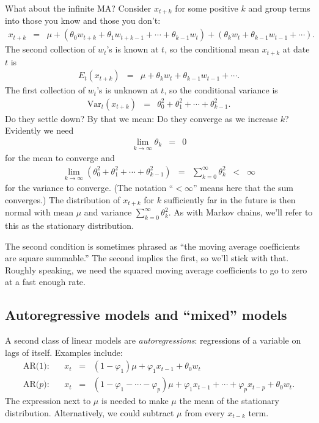 \documentclass[11pt]{article}
\begin{document}
What about the infinite MA?
Consider $x_{t+k}$ for some positive $k$ and group terms into those
you know and those you don't:
\begin{eqnarray*}
    x_{t+k} &=& \mu +
        \left(\theta_0 w_{t+k} + \theta_1 w_{t+k-1} + \cdots + \theta_{k-1} w_t  \right)
            + \left( \theta_k w_{t} + \theta_{k-1} w_{t-1} + \cdots \right) .
\end{eqnarray*}
The second collection of $w_t$'s is known at $t$,
so the conditional mean  $x_{t+k}$ at date $t$ is
\begin{eqnarray*}
    E_t (x_{t+k}) &=& \mu + \theta_k w_t + \theta_{k-1} w_{t-1} + \cdots .
\end{eqnarray*}
The first collection of $w_t$'s is unknown at $t$,
so the conditional variance is
\begin{eqnarray*}
    \mbox{Var}_t (x_{t+k}) &=& \theta_0^2 + \theta_1^2 + \cdots + \theta_{k-1}^2 .
\end{eqnarray*}
Do they settle down?
By that we mean:  Do they converge as we increase $k$?
Evidently we need
\begin{eqnarray*}
    \lim_{k\rightarrow \infty} \theta_k &=& 0
\end{eqnarray*}
for the mean to converge
and
\begin{eqnarray*}
    \lim_{k\rightarrow \infty} (\theta_0^2 + \theta_1^2 + \cdots + \theta_{k-1}^2) &=&
            \sum_{k=0}^\infty \theta_k^2 \;\;<\;\; \infty
\end{eqnarray*}
for the variance to converge.
(The notation ``$< \infty$'' means here that the sum converges.)
The distribution of $x_{t+k}$ for $k$ sufficiently far in the future
is then normal with mean $\mu$ and variance $\sum_{k=0}^\infty \theta_k^2 $.
As with Markov chains, we'll refer to this as the stationary distribution.


The second condition is sometimes phrased as ``the moving average coefficients
are square summable.''
The second implies the first, so we'll stick with that.
Roughly speaking, we need the squared moving average coefficients to
go to zero at a fast enough rate.


\subsection*{Autoregressive models and ``mixed'' models}

A second class of linear models are {\it autoregressions\/}:
regressions of a variable on lags of itself.
Examples include:
\begin{eqnarray*}
    \mbox{AR(1)}:   &&  x_t \;\;=\;\; (1-\varphi_1) \mu
            + \varphi_1 x_{t-1} + \theta_0 w_t   \\
    \mbox{AR($p$)}:   &&  x_t \;\;=\;\; (1-\varphi_1 - \cdots - \varphi_p) \mu
                + \varphi_1 x_{t-1} + \cdots + \varphi_p x_{t-p}
                                            + \theta_0 w_t .
\end{eqnarray*}
The expression next to $\mu$ is needed to make $\mu$ the mean
of the stationary distribution.
Alternatively, we could subtract $\mu$ from every $x_{t-k}$ term.
\end{document}
